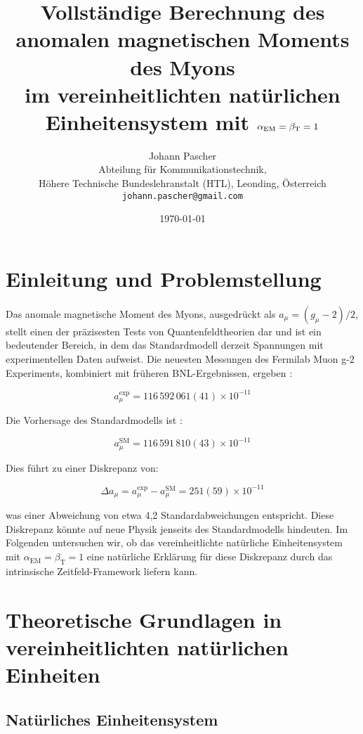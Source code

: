 \documentclass[12pt,a4paper]{article}
\title{Vollständige Berechnung des anomalen magnetischen Moments des Myons \\
	im vereinheitlichten natürlichen Einheitensystem mit $\alphaEM = \betaT = 1$}
\author{Johann Pascher\\
	Abteilung für Kommunikationstechnik, \\Höhere Technische Bundeslehranstalt (HTL), Leonding, Österreich\\
	\texttt{johann.pascher@gmail.com}}
\date{\today}
\newcommand{\alphaEM}{\alpha_{\text{EM}}}
\newcommand{\betaT}{\beta_{\text{T}}}
\begin{document}
	
	\maketitle
	
	\tableofcontents
	\newpage
	
	\section{Einleitung und Problemstellung}
	
	Das anomale magnetische Moment des Myons, ausgedrückt als $a_\mu = (g_\mu-2)/2$, stellt einen der präzisesten Tests von Quantenfeldtheorien dar und ist ein bedeutender Bereich, in dem das Standardmodell derzeit Spannungen mit experimentellen Daten aufweist. Die neuesten Messungen des Fermilab Muon g-2 Experiments, kombiniert mit früheren BNL-Ergebnissen, ergeben \cite{Muong-2:2021ojo}:
	
	\begin{equation}
		a_\mu^{\text{exp}} = 116\,592\,061(41) \times 10^{-11}
	\end{equation}
	
	Die Vorhersage des Standardmodells ist \cite{Aoyama2020}:
	
	\begin{equation}
		a_\mu^{\text{SM}} = 116\,591\,810(43) \times 10^{-11}
	\end{equation}
	
	Dies führt zu einer Diskrepanz von:
	
	\begin{equation}
		\Delta a_\mu = a_\mu^{\text{exp}} - a_\mu^{\text{SM}} = 251(59) \times 10^{-11}
	\end{equation}
	
	was einer Abweichung von etwa 4,2 Standardabweichungen entspricht. Diese Diskrepanz könnte auf neue Physik jenseits des Standardmodells hindeuten. Im Folgenden untersuchen wir, ob das vereinheitlichte natürliche Einheitensystem mit $\alphaEM = \betaT = 1$ eine natürliche Erklärung für diese Diskrepanz durch das intrinsische Zeitfeld-Framework liefern kann.
	
	\section{Theoretische Grundlagen in vereinheitlichten natürlichen Einheiten}
	
	\subsection{Natürliches Einheitensystem}
	\label{subsec:natural_unit_system}
	
\end{document}
